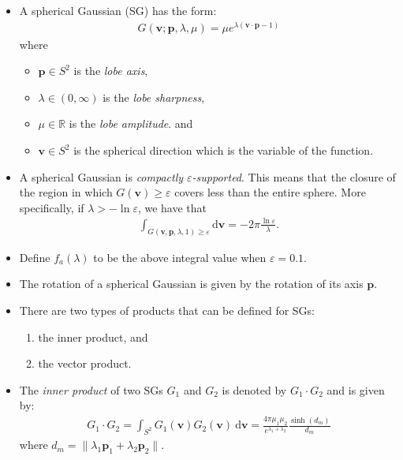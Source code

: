 \documentclass[10pt]{article}
\newcommand{\dee}{\mathrm{d}}
\newcommand{\ve}[1]{\mathbf{#1}}
\newcommand{\Real}{\mathbb{R}}
\begin{document}
  \begin{itemize}
  	\item A spherical Gaussian (SG) has the form:
  	\begin{align*}
  		G(\ve{v}; \ve{p}, \lambda, \mu) = \mu e^{\lambda (\ve{v} \cdot \ve{p}-1)}
  	\end{align*}
  	where
  	\begin{itemize}
  		\item $\ve{p} \in S^2$ is the {\em lobe axis},
  		\item $\lambda \in (0, \infty)$  is the {\em lobe sharpness},
  		\item $\mu \in \Real$ is the {\em lobe amplitude}. and
  		\item $\ve{v} \in S^2$ is the spherical direction which is the variable of the function.
  	\end{itemize}

  	\item A spherical Gaussian is \emph{compactly $\varepsilon$-supported}.  This means that the closure of the region in which $G(\ve{v}) \geq \varepsilon$ covers less than the entire sphere.  More specifically, if $\lambda > -\ln \varepsilon$, we have that
  	\begin{align*}
  		\int_{G(\ve{v},\ve{p},\lambda,1) \geq \varepsilon} \dee\ve{v} = -2\pi \frac{\ln \varepsilon}{\lambda}.
  	\end{align*}

  	\item Define $f_a(\lambda)$ to be the above integral value when $\varepsilon = 0.1$.

  	\item The rotation of a spherical Gaussian is given by the rotation of its axis $\ve{p}$.

  	\item There are two types of products that can be defined for SGs:
  	\begin{enumerate}
  		\item the inner product, and
  		\item the vector product.  		
  	\end{enumerate}

  	\item The \emph{inner product} of two SGs $G_1$ and $G_2$ is denoted by $G_1 \cdot G_2$ and is given by:
  	\begin{align*}
  		G_1 \cdot G_2 = \int_{S^2} G_1(\ve{v}) G_2(\ve{v})\ \dee\ve{v} = \frac{4\pi \mu_1 \mu_2}{e^{\lambda_1 + \lambda_2}} \frac{\sinh(d_m)}{d_m}
  	\end{align*}
  	where $d_m = \| \lambda_1 \ve{p}_1 + \lambda_2 \ve{p}_2 \|$.


\end{itemize}
\end{document}
